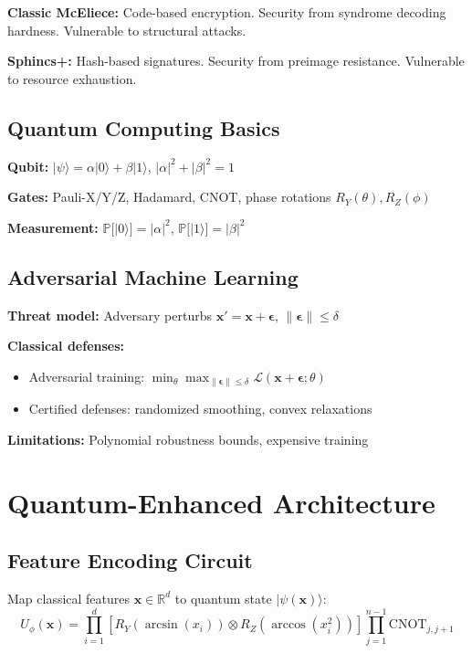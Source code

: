 \documentclass[conference]{IEEEtran}
\begin{document}
\textbf{Classic McEliece:} Code-based encryption. Security from syndrome decoding hardness. Vulnerable to structural attacks.

\textbf{Sphincs+:} Hash-based signatures. Security from preimage resistance. Vulnerable to resource exhaustion.

\subsection{Quantum Computing Basics}
\textbf{Qubit:} $|\psi\rangle = \alpha|0\rangle + \beta|1\rangle$, $|\alpha|^2 + |\beta|^2 = 1$

\textbf{Gates:} Pauli-X/Y/Z, Hadamard, CNOT, phase rotations $R_Y(\theta), R_Z(\phi)$

\textbf{Measurement:} $\mathbb{P}[|0\rangle] = |\alpha|^2$, $\mathbb{P}[|1\rangle] = |\beta|^2$

\subsection{Adversarial Machine Learning}
\textbf{Threat model:} Adversary perturbs $\mathbf{x}' = \mathbf{x} + \boldsymbol{\epsilon}$, $\|\boldsymbol{\epsilon}\| \leq \delta$

\textbf{Classical defenses:}
\begin{itemize}
\item Adversarial training: $\min_\theta \max_{\|\boldsymbol{\epsilon}\| \leq \delta} \mathcal{L}(\mathbf{x} + \boldsymbol{\epsilon}; \theta)$
\item Certified defenses: randomized smoothing, convex relaxations
\end{itemize}

\textbf{Limitations:} Polynomial robustness bounds, expensive training

\section{Quantum-Enhanced Architecture}

\subsection{Feature Encoding Circuit}
Map classical features $\mathbf{x} \in \mathbb{R}^d$ to quantum state $|\psi(\mathbf{x})\rangle$:
\begin{equation}
U_\phi(\mathbf{x}) = \prod_{i=1}^d \left[R_Y(\arcsin(x_i)) \otimes R_Z(\arccos(x_i^2))\right] \prod_{j=1}^{n-1} \text{CNOT}_{j,j+1}
\end{equation}
\end{document}
